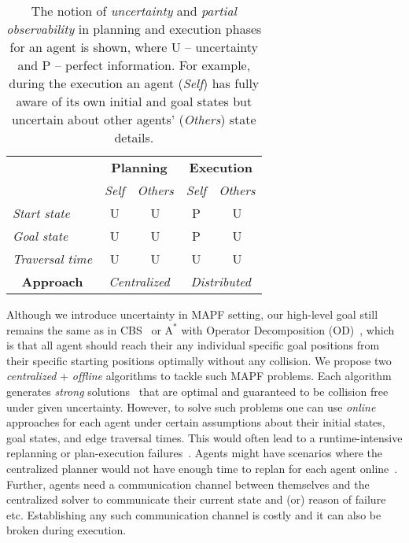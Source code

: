 \documentclass{article}
\begin{document}
\begin{table}[]
    \centering
    \begin{tabular}{| l | c | c | c | c |}
    \hline
        \multirow{2}{*}{\multicolumn{1}{c}{\textbf{Uncertainty}}} &  \multicolumn{2}{c|}{\textbf{Planning}} & \multicolumn{2}{c|}{\textbf{Execution}} \\ 
        & \emph{Self} & \emph{Others} & \emph{Self} & \emph{Others} \\ 
    \hline
        \emph{Start state} & U & U & P & U \\
        \emph{Goal state} & U & U & P & U \\
        \emph{Traversal time} & U & U & U & U \\
    \hline
        \multicolumn{1}{|c|}{\textbf{Approach}} 
        & \multicolumn{2}{c|}{\emph{Centralized}} & \multicolumn{2}{c|}{\emph{Distributed}} \\
    \hline
    \end{tabular}
    \caption{The notion of \emph{uncertainty} and \emph{partial observability} in planning and execution phases for an agent is shown, where U -- uncertainty and P -- perfect information. For example, during the execution an agent (\emph{Self}) has fully aware of its own initial and goal states but uncertain about other agents' (\emph{Others}) state details.}
    \label{tab:tab1}
\end{table}

Although we introduce uncertainty in MAPF setting, our high-level goal still remains the same as in CBS~\cite{SharonSFS12} or $\mathrm{A^*}$ with Operator Decomposition (OD)~\cite{Standley10}, which is that all agent should reach their any individual specific goal positions from their specific starting positions optimally without any collision. 
We propose two \emph{centralized} + \emph{offline} algorithms to tackle such MAPF problems. 
Each algorithm generates  \emph{strong} solutions~\cite{CimattiDMRS18} that are optimal and guaranteed to be collision free under given uncertainty. 
However, to solve such problems one can use \emph{online} approaches for each agent under certain assumptions about their initial states, goal states, and edge traversal times. 
This would often lead to a runtime-intensive replanning or plan-execution failures~\cite{0001KK17}. Agents might have scenarios where the centralized planner would not have enough time to replan for each agent online~\cite{CimattiDMRS18}. 
Further, agents need a communication channel between themselves and the centralized solver to communicate their current state and (or) reason of failure etc. Establishing any such communication channel is costly and it can also be broken during execution. 
%
\end{document}
